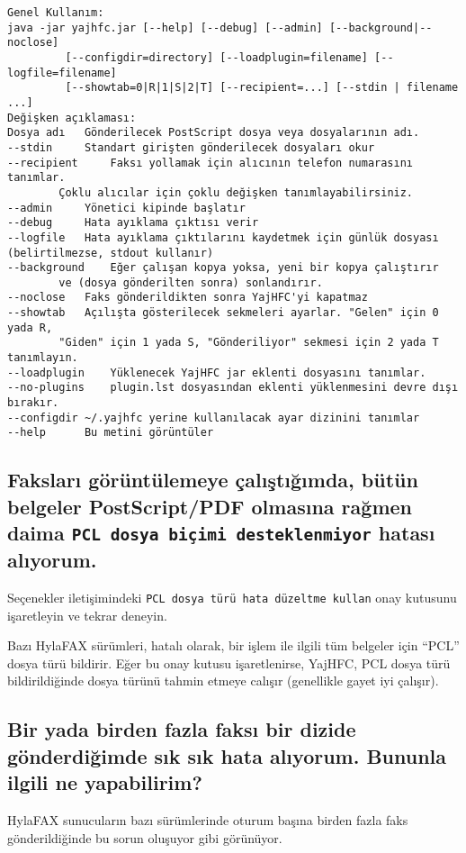\documentclass[a4paper,10pt]{scrartcl}
\begin{document}
\begin{verbatim}
Genel Kullanım:
java -jar yajhfc.jar [--help] [--debug] [--admin] [--background|--noclose]
         [--configdir=directory] [--loadplugin=filename] [--logfile=filename]
         [--showtab=0|R|1|S|2|T] [--recipient=...] [--stdin | filename ...]
Değişken açıklaması:
Dosya adı	Gönderilecek PostScript dosya veya dosyalarının adı.
--stdin 	Standart girişten gönderilecek dosyaları okur
--recipient 	Faksı yollamak için alıcının telefon numarasını tanımlar.
		Çoklu alıcılar için çoklu değişken tanımlayabilirsiniz.
--admin		Yönetici kipinde başlatır
--debug		Hata ayıklama çıktısı verir
--logfile	Hata ayıklama çıktılarını kaydetmek için günlük dosyası (belirtilmezse, stdout kullanır)
--background	Eğer çalışan kopya yoksa, yeni bir kopya çalıştırır
		ve (dosya gönderilten sonra) sonlandırır.
--noclose	Faks gönderildikten sonra YajHFC'yi kapatmaz
--showtab	Açılışta gösterilecek sekmeleri ayarlar. "Gelen" için 0 yada R, 
		"Giden" için 1 yada S, "Gönderiliyor" sekmesi için 2 yada T tanımlayın.
--loadplugin	Yüklenecek YajHFC jar eklenti dosyasını tanımlar.
--no-plugins	plugin.lst dosyasından eklenti yüklenmesini devre dışı bırakır.
--configdir	~/.yajhfc yerine kullanılacak ayar dizinini tanımlar
--help		Bu metini görüntüler
\end{verbatim}


\subsection{Faksları görüntülemeye çalıştığımda, bütün belgeler PostScript/PDF olmasına rağmen daima 
   \texttt{PCL dosya biçimi desteklenmiyor} hatası alıyorum.}

Seçenekler iletişimindeki \texttt{PCL dosya türü hata düzeltme kullan} onay kutusunu işaretleyin ve tekrar deneyin.

Bazı HylaFAX sürümleri, hatalı olarak, bir işlem ile ilgili tüm belgeler için
``PCL'' dosya türü bildirir. Eğer bu onay kutusu işaretlenirse, YajHFC, 
PCL dosya türü bildirildiğinde dosya türünü tahmin etmeye calışır (genellikle gayet iyi çalışır). 


\subsection{Bir yada birden fazla faksı bir dizide gönderdiğimde sık sık hata alıyorum. Bununla ilgili ne yapabilirim?}

HylaFAX sunucuların bazı sürümlerinde oturum başına birden fazla faks gönderildiğinde bu sorun oluşuyor gibi görünüyor.
\end{document}
